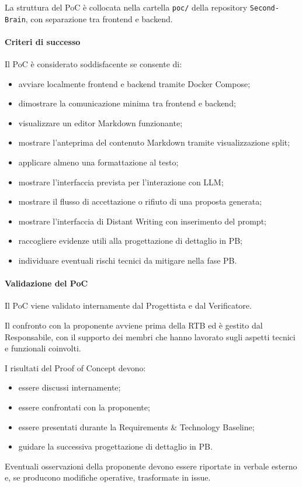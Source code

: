 La struttura del PoC è collocata nella cartella \texttt{poc/} della repository
\texttt{Second-Brain}, con separazione tra frontend e backend.

\paragraph{Criteri di successo}

Il PoC è considerato soddisfacente se consente di:

\begin{itemize}
    \item avviare localmente frontend e backend tramite Docker Compose;
    \item dimostrare la comunicazione minima tra frontend e backend;
    \item visualizzare un editor Markdown funzionante;
    \item mostrare l'anteprima del contenuto Markdown tramite visualizzazione split;
    \item applicare almeno una formattazione al testo;
    \item mostrare l'interfaccia prevista per l'interazione con LLM;
    \item mostrare il flusso di accettazione o rifiuto di una proposta generata;
    \item mostrare l'interfaccia di Distant Writing con inserimento del prompt;
    \item raccogliere evidenze utili alla progettazione di dettaglio in PB;
    \item individuare eventuali rischi tecnici da mitigare nella fase PB.
\end{itemize}

\paragraph{Validazione del PoC}

Il PoC viene validato internamente dal Progettista e dal Verificatore.

Il confronto con la proponente avviene prima della RTB ed è gestito dal
Responsabile, con il supporto dei membri che hanno lavorato sugli aspetti tecnici
e funzionali coinvolti.

I risultati del Proof of Concept devono:

\begin{itemize}
    \item essere discussi internamente;
    \item essere confrontati con la proponente;
    \item essere presentati durante la Requirements \& Technology Baseline;
    \item guidare la successiva progettazione di dettaglio in PB.
\end{itemize}

Eventuali osservazioni della proponente devono essere riportate in verbale esterno
e, se producono modifiche operative, trasformate in issue.